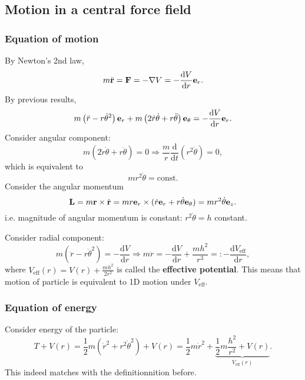 \subsection{Motion in a central force field}
\subsubsection*{Equation of motion}
By Newton's 2nd law,
\[
    m \ddot{{\bf r}} = {\bf F} = - \nabla V = -\frac{\mathrm{d}V}{\mathrm{d}r}{\bf e}_r. 
\]
By previous results,
\[
    m\left( \ddot{r}-r\dot{\theta}^2 \right){\bf e}_r+m\left( 2 \dot{r}\dot{\theta}+r \ddot{\theta} \right){\bf e}_\theta=-\frac{\mathrm{d}V}{\mathrm{d}r}{\bf e}_r. 
\]
Consider angular component: 
\[
    m\left( 2 \dot{r}\dot{\theta}+r \ddot{\theta} \right) =0
    \Longrightarrow\frac{m}{r}\frac{\mathrm{d}}{\mathrm{d}t}\left( r^2\dot{\theta} \right)=0,
\]
which is equivalent to 
\[
    m r^2 \dot{\theta} = \text{const}.
\]
Consider the angular momentum 
\[
    {\bf L} = m{\bf r} \times \dot{{\bf r}} = mr{\bf e}_r \times (\dot{r}{\bf e}_r+r \dot{\theta}{\bf e}_\theta) =mr^2 \dot{\theta}{\bf e}_z.
\]
i.e. magnitude of angular momentum is constant: $ r^2 \dot{\theta}=h $ constant.

Consider radial component: 
\begin{equation}\label{eq:radial component}\tag{$*$}
    m\left( \ddot{r}-r\dot{\theta}^2 \right) = -\frac{\mathrm{d}V}{\mathrm{d}r} \Longrightarrow m \ddot{r}=-\frac{\mathrm{d}V}{\mathrm{d}r}+\frac{mh^2}{r^3}=: -\frac{\mathrm{d}V_{\text{eff}}}{\mathrm{d}r},  
\end{equation}
where $ V_{\text{eff}}(r)=V(r)+\frac{mh^2}{2r^2} $ is called the \textbf{effective potential}. This means that motion of particle is equivalent to 1D motion under $ V_{\text{eff}} $.
\subsubsection*{Equation of energy}
Consider energy of the particle:
\[
    T+V(r) = \frac{1}{2}m \left( \dot{r}^2+r^2 \dot{\theta}^2 \right) +V(r) = \frac{1}{2}m \dot{r}^2+\underbrace{\frac{1}{2}m\frac{h^2}{r^2}+V(r)}_{V_{\text{eff}}(r)}.
\]
This indeed matches with the definitionnition before.

